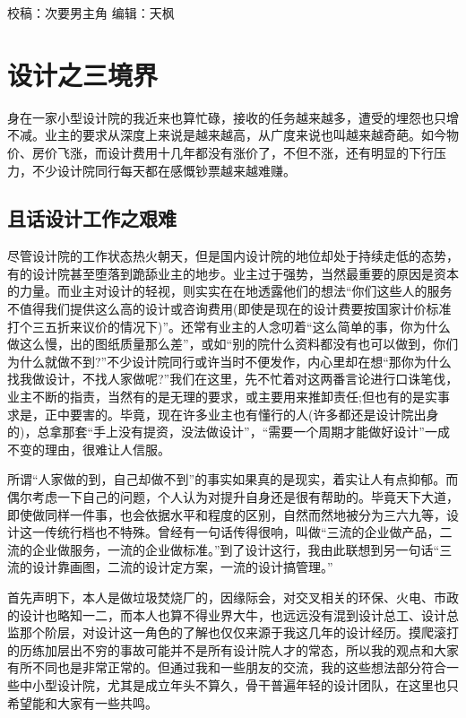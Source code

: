 \documentclass[
]{book}
\begin{document}
校稿：次要男主角
编辑：天枫

\hypertarget{ux8bbeux8ba1ux4e4bux4e09ux5883ux754c}{%
\section{设计之三境界}\label{ux8bbeux8ba1ux4e4bux4e09ux5883ux754c}}

身在一家小型设计院的我近来也算忙碌，接收的任务越来越多，遭受的埋怨也只增不减。业主的要求从深度上来说是越来越高，从广度来说也叫越来越奇葩。如今物价、房价飞涨，而设计费用十几年都没有涨价了，不但不涨，还有明显的下行压力，不少设计院同行每天都在感慨钞票越来越难赚。

\hypertarget{ux4e14ux8bddux8bbeux8ba1ux5de5ux4f5cux4e4bux8270ux96be}{%
\subsection{且话设计工作之艰难}\label{ux4e14ux8bddux8bbeux8ba1ux5de5ux4f5cux4e4bux8270ux96be}}

尽管设计院的工作状态热火朝天，但是国内设计院的地位却处于持续走低的态势，有的设计院甚至堕落到跪舔业主的地步。业主过于强势，当然最重要的原因是资本的力量。而业主对设计的轻视，则实实在在地透露他们的想法``你们这些人的服务不值得我们提供这么高的设计或咨询费用(即使是现在的设计费要按国家计价标准打个三五折来议价的情况下)''。还常有业主的人念叨着``这么简单的事，你为什么做这么慢，出的图纸质量那么差''，或如``别的院什么资料都没有也可以做到，你们为什么就做不到?''不少设计院同行或许当时不便发作，内心里却在想``那你为什么找我做设计，不找人家做呢?''我们在这里，先不忙着对这两番言论进行口诛笔伐，业主不断的指责，当然有的是无理的要求，或主要用来推卸责任;但也有的是实事求是，正中要害的。毕竟，现在许多业主也有懂行的人(许多都还是设计院出身的)，总拿那套``手上没有提资，没法做设计''，``需要一个周期才能做好设计''一成不变的理由，很难让人信服。

所谓``人家做的到，自己却做不到''的事实如果真的是现实，着实让人有点抑郁。而偶尔考虑一下自己的问题，个人认为对提升自身还是很有帮助的。毕竟天下大道，即使做同样一件事，也会依据水平和程度的区别，自然而然地被分为三六九等，设计这一传统行档也不特殊。曾经有一句话传得很响，叫做``三流的企业做产品，二流的企业做服务，一流的企业做标准。''到了设计这行，我由此联想到另一句话``三流的设计靠画图，二流的设计定方案，一流的设计搞管理。''

首先声明下，本人是做垃圾焚烧厂的，因缘际会，对交叉相关的环保、火电、市政的设计也略知一二，而本人也算不得业界大牛，也远远没有混到设计总工、设计总监那个阶层，对设计这一角色的了解也仅仅来源于我这几年的设计经历。摸爬滚打的历练加层出不穷的事故可能并不是所有设计院人才的常态，所以我的观点和大家有所不同也是非常正常的。但通过我和一些朋友的交流，我的这些想法部分符合一些中小型设计院，尤其是成立年头不算久，骨干普遍年轻的设计团队，在这里也只希望能和大家有一些共鸣。
\end{document}
